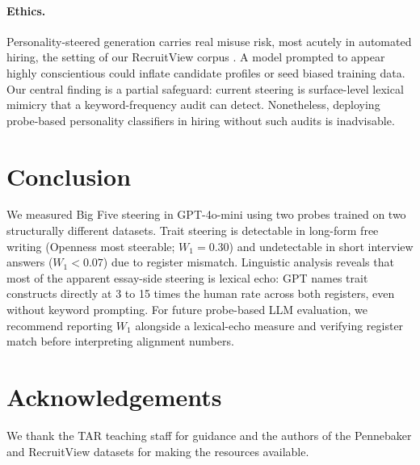 \documentclass[10pt, a4paper]{article}
\begin{document}
\paragraph{Ethics.} Personality-steered generation carries real misuse risk, most acutely in automated hiring, the setting of our RecruitView corpus \citep{gupta-etal-2025-recruitview}. A model prompted to appear highly conscientious could inflate candidate profiles or seed biased training data. Our central finding is a partial safeguard: current steering is surface-level lexical mimicry that a keyword-frequency audit can detect. Nonetheless, deploying probe-based personality classifiers in hiring without such audits is inadvisable.

\section{Conclusion}

We measured Big Five steering in GPT-4o-mini using two probes trained on two structurally different datasets. Trait steering is detectable in long-form free writing (Openness most steerable; $W_1=0.30$) and undetectable in short interview answers ($W_1<0.07$) due to register mismatch. Linguistic analysis reveals that most of the apparent essay-side steering is lexical echo: GPT names trait constructs directly at 3 to 15 times the human rate across both registers, even without keyword prompting. For future probe-based LLM evaluation, we recommend reporting $W_1$ alongside a lexical-echo measure and verifying register match before interpreting alignment numbers.

\section*{Acknowledgements}

We thank the TAR teaching staff for guidance and the authors of the Pennebaker and RecruitView datasets for making the resources available.



\end{document}
